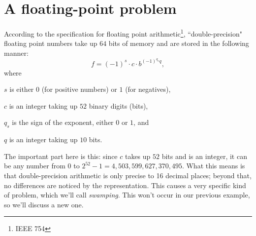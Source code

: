 \documentclass[m3380-lec-main.tex]{subfiles}
\begin{document}
\section{A floating-point problem}
According to the specification for floating point arithmetic\footnote{IEEE 754}, ``double-precision" floating point numbers take up $64$ bits of memory and are stored in the following manner:
\[ f = (-1)^s\cdot c\cdot b^{(-1)^{q_s}q},\]
where
\begin{enum}
\item $s$ is either $0$ (for positive numbers) or $1$ (for negatives),
\item $c$ is an integer taking up $52$ binary digits (bits),
\item $q_s$ is the sign of the exponent, either $0$ or $1$, and
\item $q$ is an integer taking up $10$ bits.
\end{enum}
The important part here is this: since $c$ takes up $52$ bits and is an integer, it can be any number from $0$ to $2^{52}-1={4,503,599,627,370,495}$. What this means is that double-precision arithmetic is only precise to 16 decimal places; beyond that, no differences are noticed by the representation. This causes a very specific kind of problem, which we'll call \emph{swamping}. This won't occur in our previous example, so we'll discuss a new one.
\end{document}
